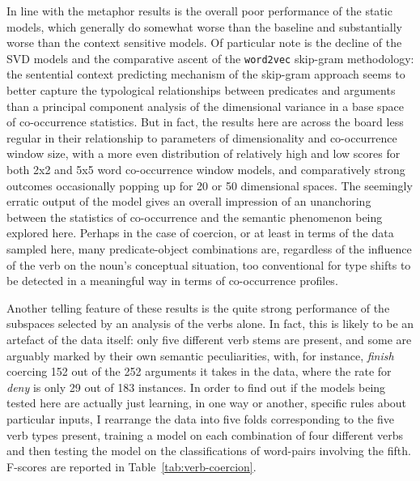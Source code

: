 In line with the metaphor results is the overall poor performance of the static models, which generally do somewhat worse than the baseline and substantially worse than the context sensitive models.  Of particular note is the decline of the \textsc{SVD} models and the comparative ascent of the \texttt{word2vec} skip-gram methodology: the sentential context predicting mechanism of the skip-gram approach seems to better capture the typological relationships between predicates and arguments than a principal component analysis of the dimensional variance in a base space of co-occurrence statistics.  But in fact, the results here are across the board less regular in their relationship to parameters of dimensionality and co-occurrence window size, with a more even distribution of relatively high and low scores for both 2x2 and 5x5 word co-occurrence window models, and comparatively strong outcomes occasionally popping up for 20 or 50 dimensional spaces.  The seemingly erratic output of the model gives an overall impression of an unanchoring between the statistics of co-occurrence and the semantic phenomenon being explored here.  Perhaps in the case of coercion, or at least in terms of the data sampled here, many predicate-object combinations are, regardless of the influence of the verb on the noun's conceptual situation, too conventional for type shifts to be detected in a meaningful way in terms of co-occurrence profiles.

Another telling feature of these results is the quite strong performance of the subspaces selected by an analysis of the verbs alone.  In fact, this is likely to be an artefact of the data itself: only five different verb stems are present, and some are arguably marked by their own semantic peculiarities, with, for instance, \emph{finish} coercing 152 out of the 252 arguments it takes in the data, where the rate for \emph{deny} is only 29 out of 183 instances.  In order to find out if the models being tested here are actually just learning, in one way or another, specific rules about particular inputs, I rearrange the data into five folds corresponding to the five verb types present, training a model on each combination of four different verbs and then testing the model on the classifications of word-pairs involving the fifth.  F-scores are reported in Table~\ref{tab:verb-coercion}.

